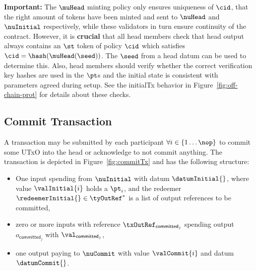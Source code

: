\noindent \textbf{Important:} The $\muHead$ minting policy only ensures
uniqueness of $\cid$, that the right amount of tokens have been minted and sent
to $\nuHead$ and $\nuInitial$ respectively, while these validators in turn
ensure continuity of the contract. However, it is \textbf{crucial} that all head
members check that head output always contains an $\st$ token of policy $\cid$
which satisfies $\cid = \hash(\muHead(\seed))$. The $\seed$ from a head datum
can be used to determine this. Also, head members should verify whether the
correct verification key hashes are used in the $\pt$s and the initial state is
consistent with parameters agreed during setup. See the initialTx behavior in
Figure~\ref{fig:off-chain-prot} for details about these checks.\\

\subsection{Commit Transaction}\label{sec:commit-tx}

A \mtxCom{} transaction may be submitted by each participant
$\forall i \in \{1 \dots \nop\}$ to commit some UTxO into the head or
acknowledge to not commit anything. The transaction is depicted in
Figure~\ref{fig:commitTx} and has the following structure:
\begin{itemize}
	\item One input spending from $\nuInitial$ with datum $\datumInitial{}$,
	      where value $\valInitial{i}$ holds a $\pt_i$, and the redeemer
	      $\redeemerInitial{} \in \tyOutRef^{*}$ is a list of output
	      references to be committed,
	\item zero or more inputs with reference $\txOutRef_{\mathsf{committed}_{j}}$
	      spending output $o_{\mathsf{committed}_{j}}$ with
	      $\val_{\mathsf{committed}_{j}}$,
	\item one output paying to $\nuCommit$ with value $\valCommit{i}$ and datum $\datumCommit{}$.
\end{itemize}

